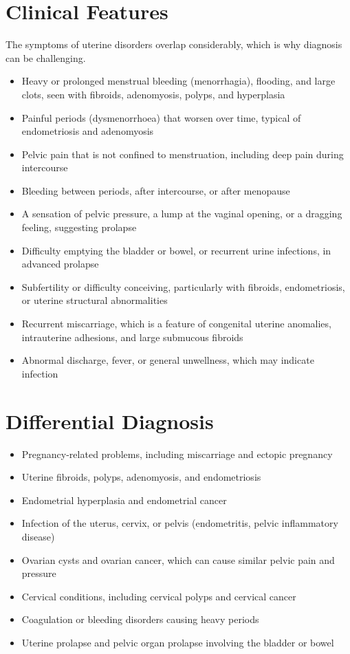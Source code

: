 \section*{Clinical Features}
The symptoms of uterine disorders overlap considerably, which is why diagnosis can be challenging.

\begin{itemize}
    \item Heavy or prolonged menstrual bleeding (menorrhagia), flooding, and large clots, seen with fibroids, adenomyosis, polyps, and hyperplasia
    \item Painful periods (dysmenorrhoea) that worsen over time, typical of endometriosis and adenomyosis
    \item Pelvic pain that is not confined to menstruation, including deep pain during intercourse
    \item Bleeding between periods, after intercourse, or after menopause
    \item A sensation of pelvic pressure, a lump at the vaginal opening, or a dragging feeling, suggesting prolapse
    \item Difficulty emptying the bladder or bowel, or recurrent urine infections, in advanced prolapse
    \item Subfertility or difficulty conceiving, particularly with fibroids, endometriosis, or uterine structural abnormalities
    \item Recurrent miscarriage, which is a feature of congenital uterine anomalies, intrauterine adhesions, and large submucous fibroids
    \item Abnormal discharge, fever, or general unwellness, which may indicate infection
\end{itemize}

\section*{Differential Diagnosis}
\begin{itemize}
    \item Pregnancy-related problems, including miscarriage and ectopic pregnancy
    \item Uterine fibroids, polyps, adenomyosis, and endometriosis
    \item Endometrial hyperplasia and endometrial cancer
    \item Infection of the uterus, cervix, or pelvis (endometritis, pelvic inflammatory disease)
    \item Ovarian cysts and ovarian cancer, which can cause similar pelvic pain and pressure
    \item Cervical conditions, including cervical polyps and cervical cancer
    \item Coagulation or bleeding disorders causing heavy periods
    \item Uterine prolapse and pelvic organ prolapse involving the bladder or bowel
\end{itemize}

